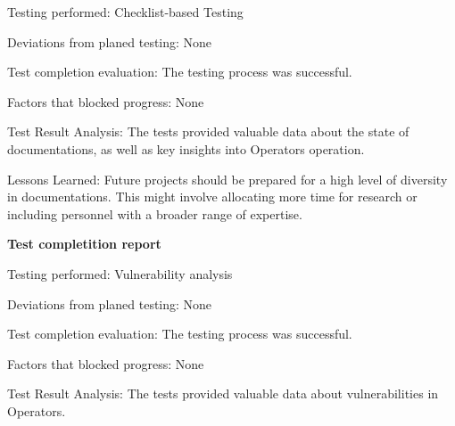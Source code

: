 Testing performed: Checklist-based Testing

Deviations from planed testing: None

Test completion evaluation: The testing process was successful.

Factors that blocked progress: None

Test Result Analysis: The tests provided valuable data about the state of documentations, as well as key insights into Operators operation.

Lessons Learned: Future projects should be prepared for a high level of diversity in documentations. This might involve allocating more time for research or including personnel with a broader range of expertise.




\textbf{Test completition report}

Testing performed: Vulnerability analysis

Deviations from planed testing: None

Test completion evaluation: The testing process was successful.

Factors that blocked progress: None

Test Result Analysis: The tests provided valuable data about vulnerabilities in Operators.

